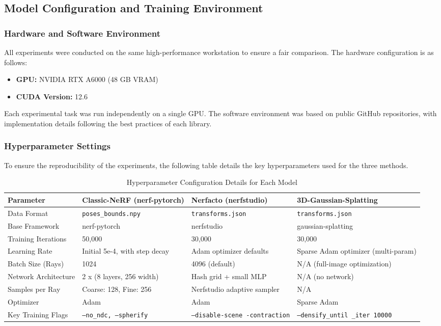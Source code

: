 \documentclass[11pt]{article}
\begin{document}
\subsection{Model Configuration and Training Environment}

\subsubsection{Hardware and Software Environment}
All experiments were conducted on the same high-performance workstation to ensure a fair comparison. The hardware configuration is as follows:
\begin{itemize}
    \item \textbf{GPU:} NVIDIA RTX A6000 (48 GB VRAM)
    \item \textbf{CUDA Version:} 12.6
\end{itemize}
 Each experimental task was run independently on a single GPU. The software environment was based on public GitHub repositories, with implementation details following the best practices of each library.

\subsubsection{Hyperparameter Settings}
To ensure the reproducibility of the experiments, the following table details the key hyperparameters used for the three methods.

\begin{table}[h!]
\centering
\caption{Hyperparameter Configuration Details for Each Model}
\label{tab:hyperparams}
\begin{tabular}{|l|p{3.5cm}|p{3.5cm}|p{3.5cm}|}
\hline
\textbf{Parameter} & \textbf{Classic-NeRF
(nerf-pytorch)} & \textbf{Nerfacto            (nerfstudio)} & \textbf{3D-Gaussian-Splatting} \\ \hline
Data Format & \texttt{poses\_bounds.npy} & \texttt{transforms.json} & \texttt{transforms.json} \\ \hline
Base Framework & nerf-pytorch & nerfstudio & gaussian-splatting \\ \hline
Training Iterations & 50,000 & 30,000 & 30,000 \\ \hline
Learning Rate & Initial 5e-4, with step decay & Adam optimizer defaults & Sparse Adam optimizer (multi-param) \\ \hline
Batch Size (Rays) & 1024 & 4096 (default) & N/A (full-image optimization) \\ \hline
Network Architecture & 2 x (8 layers, 256 width) & Hash grid + small MLP & N/A (no network) \\ \hline
Samples per Ray & Coarse: 128, Fine: 256 & Nerfstudio adaptive sampler & N/A \\ \hline
Optimizer & Adam & Adam & Sparse Adam \\ \hline
Key Training Flags & \texttt{--no\_ndc, --spherify} & \texttt{--disable-scene
-contraction} & \texttt{--densify\_until
\_iter 10000} \\ \hline
\end{tabular}
\end{table}
\end{document}
